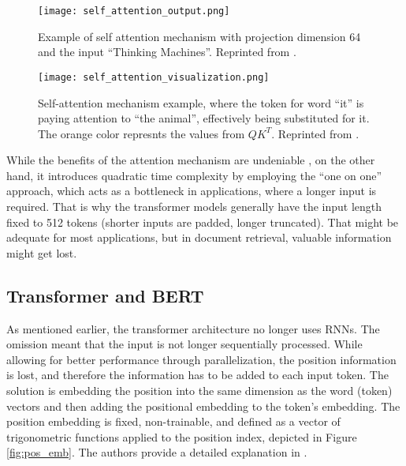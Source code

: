 \begin{figure}[!htb]
	\centering
	\begin{minipage}{.49\textwidth}
		\centering
		\texttt{[image: self\_attention\_output.png]}
                \caption{Example of self attention mechanism with projection dimension 64 and the input ``Thinking Machines''. Reprinted from \citep{illustrated-transformer}.}
	\end{minipage}
        \hfill
	\begin{minipage}{.49\textwidth}
		\centering
		\texttt{[image: self\_attention\_visualization.png]}
                \caption{Self-attention mechanism example, where the token for word ``it'' is paying attention to ``the animal'', effectively being substituted for it. The orange color represnts the values from $QK^T$. Reprinted from \citep{illustrated-transformer}.}
                \label{fig:self-attn}
	\end{minipage}
\end{figure}

While the benefits of the attention mechanism are undeniable \citep{attention-is-all-you-need}, on the other hand, it introduces quadratic time complexity by employing the ``one on one'' approach, which acts as a bottleneck in applications, where a longer input is required.
That is why the transformer models generally have the input length fixed to 512 tokens (shorter inputs are padded, longer truncated).
That might be adequate for most applications, but in document retrieval, valuable information might get lost.

\subsection{Transformer and BERT}

As mentioned earlier, the transformer architecture no longer uses RNNs.
The omission meant that the input is not longer sequentially processed.
While allowing for better performance through parallelization, the position information is lost, and therefore the information has to be added to each input token.
The solution is embedding the position into the same dimension as the word (token) vectors and then adding the positional embedding to the token's embedding.
The position embedding is fixed, non-trainable, and defined as a vector of trigonometric functions applied to the position index, depicted in Figure \ref{fig:pos_emb}.
The authors provide a detailed explanation in \citep[Section 3.5]{attention-is-all-you-need}.

